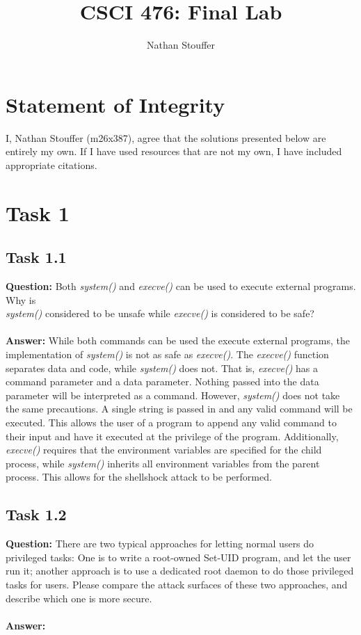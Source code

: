 \documentclass[11pt]{article}
\newcommand{\sys}{\textit{system()} }
\newcommand{\exec}{\textit{execve()} }
\begin{document}
\title{CSCI 476: Final Lab}
\author{Nathan Stouffer}
\maketitle
\newpage

\section*{Statement of Integrity}
I, Nathan Stouffer (m26x387), agree that the solutions presented below are entirely my own. If I have used resources that are not my own, I have included appropriate citations.

\section*{Task 1}

\subsection*{Task 1.1}

\textbf{Question: } Both \textit{system()} and \textit{execve()} can be used to execute external programs. Why is \\ \textit{system()} considered to be unsafe while \textit{execve()} is considered to be safe? \\\\
\textbf{Answer: } While both commands can be used the execute external programs, the implementation of \textit{system()} is not as safe as \textit{execve()}. The \textit{execve()} function separates data and code, while \sys does not. That is, \exec has a command parameter and a data parameter. Nothing passed into the data parameter will be interpreted as a command. However, \sys does not take the same precautions. A single string is passed in and any valid command will be executed. This allows the user of a program to append any valid command to their input and have it executed at the privilege of the program. Additionally, \exec requires that the environment variables are specified for the child process, while \sys inherits all environment variables from the parent process. This allows for the shellshock attack to be performed.

\subsection*{Task 1.2}

\textbf{Question: } There are two typical approaches for letting normal users do privileged tasks: One is to write a root-owned Set-UID program, and let the user run it; another approach is to use a dedicated root daemon to do those privileged tasks for users. Please compare the attack surfaces of these two approaches, and describe which one is more secure. \\\\
\textbf{Answer: }
\end{document}

